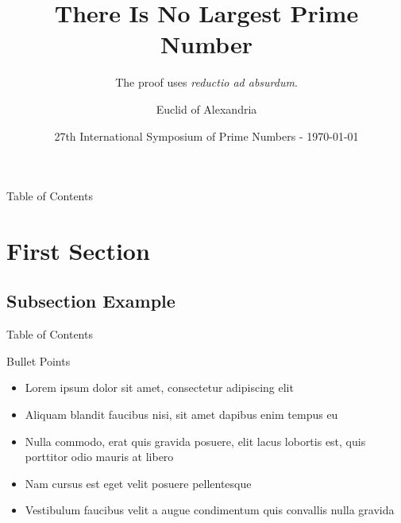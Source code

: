\documentclass[aspectratio=169]{beamer}
\title{There Is No Largest Prime Number}
\author[Euclid]{Euclid of Alexandria}
\date[\today]{27th International Symposium of Prime Numbers - \today} %
\subtitle{The proof uses \textit{reductio ad absurdum}.}
\institute[UofA]{University of Alexandria}
\begin{document}
\begin{frame}
  \titlepage
\end{frame}

\begin{frame}{Table of Contents}
  \tableofcontents 
\end{frame}
  
\section{First Section} %
  
\subsection{Subsection Example} %
  
\begin{frame}{Table of Contents} 
  \tableofcontents[currentsection] %
\end{frame}
  
\begin{frame}{Bullet Points}
  \begin{itemize}
    \item Lorem ipsum dolor sit amet, consectetur adipiscing elit
    \item Aliquam blandit faucibus nisi, sit amet dapibus enim tempus eu
    \item Nulla commodo, erat quis gravida posuere, elit lacus lobortis est, quis porttitor odio mauris at libero
    \item Nam cursus est eget velit posuere pellentesque
    \item Vestibulum faucibus velit a augue condimentum quis convallis nulla gravida
  \end{itemize}
\end{frame}
\end{document}
